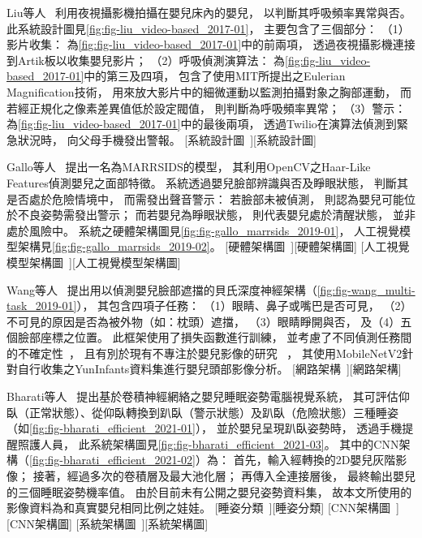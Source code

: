 \documentclass[class=NCU_thesis, crop=false]{standalone}
\begin{document}
Liu等人~\cite{liu_video-based_2017}
利用夜視攝影機拍攝在嬰兒床內的嬰兒，
以判斷其呼吸頻率異常與否。
此系統設計圖見\cref{fig:fig-liu_video-based_2017-01}，
主要包含了三個部分：
（1）影片收集：
為\cref{fig:fig-liu_video-based_2017-01}中的前兩項，
透過夜視攝影機連接到Artik板以收集嬰兒影片；
（2）呼吸偵測演算法：
為\cref{fig:fig-liu_video-based_2017-01}中的第三及四項，
包含了使用MIT所提出之Eulerian Magnification技術，
用來放大影片中的細微運動以監測拍攝對象之胸部運動，
而若經正規化之像素差異值低於設定閥值，
則判斷為呼吸頻率異常；
（3）警示：
為\cref{fig:fig-liu_video-based_2017-01}中的最後兩項，
透過Twilio在演算法偵測到緊急狀況時，
向父母手機發出警報。
[系統設計圖~\cite{liu_video-based_2017}][系統設計圖]

Gallo等人~\cite{gallo_marrsids_2019}
提出一名為MARRSIDS的模型，
其利用OpenCV之Haar-Like Features偵測嬰兒之面部特徵。
系統透過嬰兒臉部辨識與否及睜眼狀態，
判斷其是否處於危險情境中，
而需發出聲音警示：
若臉部未被偵測，
則認為嬰兒可能位於不良姿勢需發出警示；
而若嬰兒為睜眼狀態，
則代表嬰兒處於清醒狀態，
並非處於風險中。
系統之硬體架構圖見\cref{fig:fig-gallo_marrsids_2019-01}，
人工視覺模型架構見\cref{fig:fig-gallo_marrsids_2019-02}。
[硬體架構圖~\cite{gallo_marrsids_2019}][硬體架構圖]
[人工視覺模型架構圖~\cite{gallo_marrsids_2019}][人工視覺模型架構圖]

Wang等人~\cite{wang_multi-task_2019}
提出用以偵測嬰兒臉部遮擋的貝氏深度神經架構（\cref{fig:fig-wang_multi-task_2019-01}），
其包含四項子任務：
（1）眼睛、鼻子或嘴巴是否可見，
（2）不可見的原因是否為被外物（如：枕頭）遮擋，
（3）眼睛睜開與否，
及（4）五個臉部座標之位置。
此框架使用了損失函數進行訓練，
並考慮了不同偵測任務間的不確定性~\cite{kendall_what_2017}，
且有別於現有不專注於嬰兒影像的研究
~\cite{viitaniemi_detecting_2013, ge_detecting_2017, ghiasi_using_2015}，
其使用MobileNetV2針對自行收集之YunInfants資料集進行嬰兒頭部影像分析。
[網路架構~\cite{wang_multi-task_2019}][網路架構]

Bharati等人~\cite{bharati_efficient_2021}
提出基於卷積神經網絡之嬰兒睡眠姿勢電腦視覺系統，
其可評估仰臥（正常狀態）、從仰臥轉換到趴臥（警示狀態）及趴臥（危險狀態）三種睡姿
（如\cref{fig:fig-bharati_efficient_2021-01}），
並於嬰兒呈現趴臥姿勢時，
透過手機提醒照護人員，
此系統架構圖見\cref{fig:fig-bharati_efficient_2021-03}。
其中的CNN架構（\cref{fig:fig-bharati_efficient_2021-02}）為：
首先，輸入經轉換的2D嬰兒灰階影像；
接著，經過多次的卷積層及最大池化層；
再傳入全連接層後，
最終輸出嬰兒的三個睡眠姿勢機率值。
由於目前未有公開之嬰兒姿勢資料集，
故本文所使用的影像資料為和真實嬰兒相同比例之娃娃。
[睡姿分類~\cite{bharati_efficient_2021}][睡姿分類]
[CNN架構圖~\cite{bharati_efficient_2021}][CNN架構圖]
[系統架構圖~\cite{bharati_efficient_2021}][系統架構圖]
\end{document}
